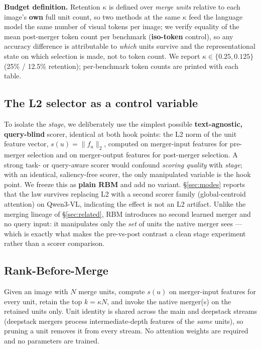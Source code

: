 \documentclass[sigconf,review,anonymous]{acmart}
\begin{document}
\textbf{Budget definition.} Retention $\kappa$ is defined over \emph{merge
units} relative to each image's \textbf{own} full unit count, so two methods at
the same $\kappa$ feed the language model the same number of visual tokens per
image; we verify equality of the mean post-merger token count per benchmark
(\textbf{iso-token} control), so any accuracy difference is attributable to
\emph{which} units survive and the representational state on which selection is
made, not to token count. We report $\kappa \in \{0.25, 0.125\}$ (25\% / 12.5\%
retention); per-benchmark token counts are printed with each table.

\subsection{The L2 selector as a control variable}\label{sec:selector}

To isolate the \emph{stage}, we deliberately use the simplest possible
\textbf{text-agnostic, query-blind} scorer, identical at both hook points: the
L2 norm of the unit feature vector, $s(u) = \| f_u \|_2$, computed on
merger-input features for pre-merger selection and on merger-output features for
post-merger selection. A strong task- or query-aware scorer would confound
\emph{scoring quality} with \emph{stage}; with an identical, saliency-free
scorer, the only manipulated variable is the hook point. We freeze this as
\textbf{plain RBM} and add no variant. \S\ref{sec:modes} reports that the law
survives replacing L2 with a second scorer family (global-centroid attention) on
Qwen3-VL, indicating the effect is not an L2 artifact. Unlike the merging
lineage of \S\ref{sec:related}, RBM introduces no second learned merger and no
query input: it manipulates only the \emph{set} of units the native merger sees
--- which is exactly what makes the pre-vs-post contrast a clean stage
experiment rather than a scorer comparison.

\subsection{Rank-Before-Merge}\label{sec:rbm}

Given an image with $N$ merge units, compute $s(u)$ on merger-input features for
every unit, retain the top $k = \kappa N$, and invoke the native merger(s) on
the retained units only. Unit identity is shared across the main and deepstack
streams (deepstack mergers process intermediate-depth features of the
\emph{same} units), so pruning a unit removes it from every stream. No attention
weights are required and no parameters are trained.
\end{document}
